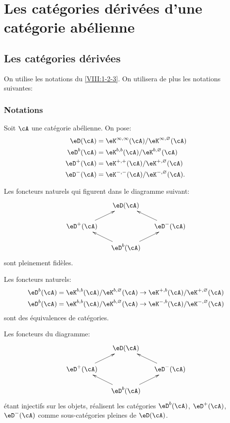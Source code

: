 \section{Les catégories dérivées d'une catégorie abélienne}\label{VIII:3}





\subsection{Les catégories dérivées}\label{VIII:3-1}

On utilise les notations du \ref{VIII:1-2-3}. On utilisera de plus les 
notations suivantes: 

\subsubsection{Notations}\label{VIII:3-1-1}

Soit $\cA$ une catégorie abélienne. On pose: 
\begin{align*}
  \eD(\cA) &= \eK^{\infty,\infty}(\cA)/\eK^{\infty,\varnothing}(\cA) \\
  \eD^b(\cA) &= \eK^{b,b}(\cA)/\eK^{b,\varnothing}(\cA) \\
  \eD^+(\cA) &= \eK^{+,+}(\cA) / \eK^{+,\varnothing}(\cA) \\
  \eD^-(\cA) &= \eK^{-,-}(\cA) / \eK^{-,\varnothing}(\cA) \text{.}
\end{align*}





\begin{proposition}\label{VIII:3-1-2}
Les foncteurs naturels qui figurent dans le diagramme suivant: 
\[\xymatrix@=0.5cm{
  & \eD(\cA) \\
  \eD^+(\cA) \ar[ur] 
    & & \eD^-(\cA) \ar[ul] \\
  & \eD^b(\cA) \ar[ul] \ar[ur] 
}\]
sont pleinement fidèles. 

Les foncteurs naturels: 
\begin{align*}
  \eD^b(\cA) &= \eK^{b,b}(\cA)/\eK^{b,\varnothing}(\cA) \to \eK^{+,b}(\cA)/\eK^{+,\varnothing}(\cA) \\
  \eD^b(\cA) &= \eK^{b,b}(\cA)/\eK^{b,\varnothing}(\cA) \to \eK^{-,b}(\cA) / \eK^{-,\varnothing}(\cA) 
\end{align*}
sont des équivalences de catégories. 

Les foncteurs du diagramme: 
\[\xymatrix@=0.5cm{
  & \eD(\cA) \\
  \eD^+(\cA) \ar[ur] 
    & & \eD^-(\cA) \ar[ul] \\
  & \eD^b(\cA) \ar[ul] \ar[ur]
}\]
étant injectifs sur les objets, réalisent les catégories $\eD^b(\cA)$, 
$\eD^+(\cA)$, $\eD^-(\cA)$ comme sous-catégories pleines de $\eD(\cA)$. 
\end{proposition}


